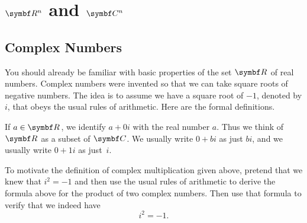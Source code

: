    \section{$\R n$ and $\C n$}
\label{Rn_and_Cn}


\subsection{Complex Numbers}

You should already be familiar with basic properties of the set
$\R{}$ of real numbers.  Complex numbers were invented so that we
can take square roots of negative numbers.  The
idea is to assume we have  a square root of $-1$,
denoted by $i$, that obeys the usual rules of arithmetic. Here are the formal definitions.


If $a \in \R{}$, we identify $a + 0i$ with the real number $a$.    Thus we
think of $\R{}$ as a subset of $\C{}$. We usually write $0 + bi$ as just $bi$, and we usually write $0 + 1i$ as just~$i$.


To motivate the definition of complex multiplication given above, pretend that we knew that $i^2 = -1$ and then use the usual rules of arithmetic to derive the formula above for the product of two complex numbers. Then use that formula to verify that we indeed have
\[
i^2 = -1.
\]

